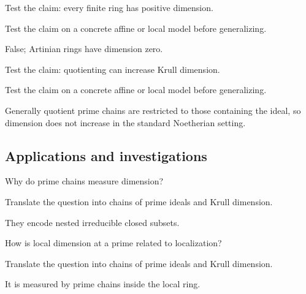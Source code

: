 \begin{exercise}\label{exr:vi29-expand-11}
Test the claim: every finite ring has positive dimension.
\end{exercise}
\begin{hint}
Test the claim on a concrete affine or local model before generalizing.
\end{hint}
\begin{solution}
False; Artinian rings have dimension zero.
\end{solution}

\begin{exercise}\label{exr:vi29-expand-12}
Test the claim: quotienting can increase Krull dimension.
\end{exercise}
\begin{hint}
Test the claim on a concrete affine or local model before generalizing.
\end{hint}
\begin{solution}
Generally quotient prime chains are restricted to those containing the ideal, so dimension does not increase in the standard Noetherian setting.
\end{solution}

\subsection*{Applications and investigations}

\begin{exercise}\label{exr:vi29-expand-13}
Why do prime chains measure dimension?
\end{exercise}
\begin{hint}
Translate the question into chains of prime ideals and Krull dimension.
\end{hint}
\begin{solution}
They encode nested irreducible closed subsets.
\end{solution}

\begin{exercise}\label{exr:vi29-expand-14}
How is local dimension at a prime related to localization?
\end{exercise}
\begin{hint}
Translate the question into chains of prime ideals and Krull dimension.
\end{hint}
\begin{solution}
It is measured by prime chains inside the local ring.
\end{solution}

